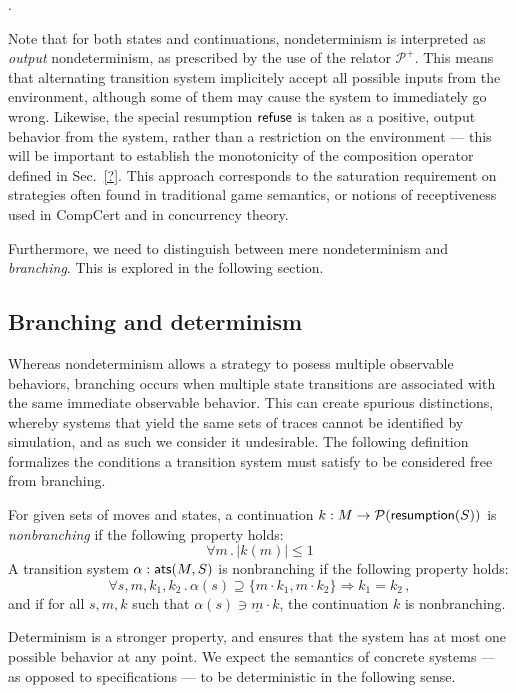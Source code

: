 .\\

{ \color{gray}
Note that for both states and continuations,
nondeterminism is interpreted as \emph{output} nondeterminism,
as prescribed by the use of the relator $\mathcal{P}^+$.
This means that alternating transition system
implicitely accept all possible inputs from the environment,
although some of them may cause the system to immediately go wrong.
Likewise,
the special resumption $ \mathsf{refuse} $
is taken as a positive, output behavior from the system,
rather than a restriction on the environment ---
this will be important to establish the monotonicity
of the composition operator defined in Sec.~\ref{?}.
This approach corresponds to the saturation requirement on strategies
often found in traditional game semantics,
or notions of receptiveness used in CompCert
and in concurrency theory.

Furthermore, we need to distinguish between mere nondeterminism
and \emph{branching}.
This is explored in the following section.

\subsection{Branching and determinism}

Whereas nondeterminism allows a strategy to posess
multiple observable behaviors,
branching occurs when multiple state transitions
are associated with the same immediate observable behavior.
This can create spurious distinctions,
whereby systems that yield the same sets of traces
cannot be identified by simulation,
and as such we consider it undesirable.
The following definition
formalizes the conditions a transition system must satisfy
to be considered free from branching.

\begin{definition}
For given sets of moves and states,
a continuation $k : M \rightarrow \mathcal{P}( \mathsf{resumption} (S))$
is \emph{nonbranching} if the following property holds:
\[ \forall m \,.\, | k(m) | \le 1 \]
A transition system $\alpha :  \mathsf{ats} (M, S)$ is nonbranching
if the following property holds:
\[ \forall s, m, k_1, k_2 \,.\,
     \alpha(s) \supseteq \{ m \cdot k_1, m \cdot k_2 \} \Rightarrow
     k_1 = k_2 \,, \]
and if for all $s, m, k$ such that $\alpha(s) \ni \underline{m} \cdot k$,
the continuation $k$ is nonbranching.
\end{definition}

Determinism is a stronger property,
and ensures that the system has at most one possible behavior
at any point.
We expect the semantics of concrete systems ---
as opposed to specifications ---
to be deterministic in the following sense.

}
